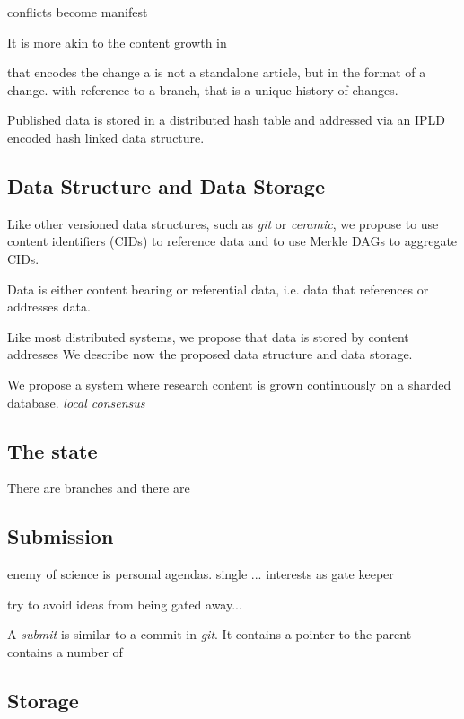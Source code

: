 \documentclass[14pt]{article}
\begin{document}
conflicts become manifest

It is more akin to the content growth in 

that encodes the change a is not a standalone article, but in the format of a change. with reference to a branch, that is a unique history of changes.  

Published data is stored in a distributed hash table and addressed via an IPLD encoded hash linked data structure. 

\subsection{Data Structure and Data Storage} \label{ssc:datastructure}

Like other versioned data structures, such as \textit{git} or \textit{ceramic}, we propose to use content identifiers (CIDs) to reference data and to use Merkle DAGs to aggregate CIDs. 


Data is either content bearing or referential data, i.e. data that references or addresses data. 

Like most distributed systems, we propose that data is stored by  content addresses
We describe now the proposed data structure and data storage. 


We propose a system where research content is grown continuously on a sharded database. \textit{local consensus}

\subsection{The state}

There are branches and there are 

\subsection{Submission}
\label{ssc:Element_submission}

enemy of science is personal agendas.
single ... interests as gate keeper

try to avoid ideas from being gated away...

A \textit{submit} is similar to a commit in \textit{git}. It contains a pointer to the parent  contains a number of 

\subsection{Storage}
\end{document}
